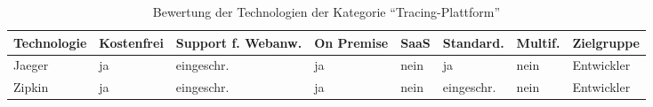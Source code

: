\begin{table}[H]%
\centering
\addtolength{\leftskip}{-2cm}
\addtolength{\rightskip}{-2cm}
\begin{tabular}{|p{3.05cm}|p{1.8cm}|p{1.7cm}|p{1.2cm}|p{1.3cm}|p{1.7cm}|p{1.3cm}|p{2.6cm}|}
\hline
Technologie & Kostenfrei & Support f. Webanw. & On \mbox{Premise} & SaaS & Standard. & Multif. & Zielgruppe \\
\hline
Jaeger & ja & eingeschr. & ja & nein & ja & nein & Entwickler \\
\hline
Zipkin & ja & eingeschr. & ja & nein & eingeschr. & nein & Entwickler \\
\hline
\end{tabular}
\caption{Bewertung der Technologien der Kategorie \enquote{Tracing-Plattform}}
\label{tab:technologie-bewertung-tracing-plattform}
\end{table}
